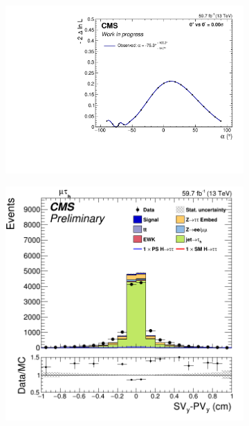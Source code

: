 \begin{figure}[!ht]
        \centering
  \begin{subfigure}[b]{0.33\linewidth}
    \centering
    \includegraphics[width=\linewidth]{Chapitre7/Images/alpha18dpub.pdf} 
    \caption{} 
    \vspace{0.5ex}
  \end{subfigure}%
  \begin{subfigure}[b]{0.33\linewidth}
    \centering
    \includegraphics[width=\linewidth]{Chapitre7/Images/TauFlightYfakes.png} 
    \caption{} 
    \vspace{0.5ex}
  \end{subfigure} 
    \caption{}
    \label{SIGcategorydp}
\end{figure}